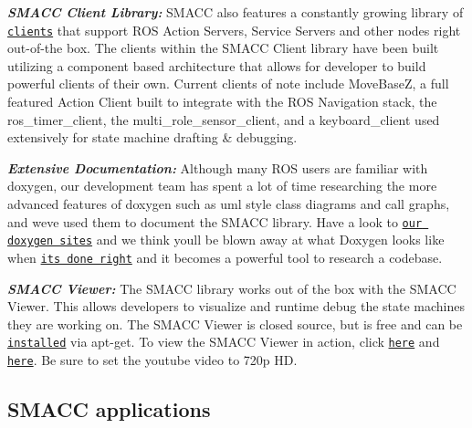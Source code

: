\begin{DoxyItemize}
\item {\itshape {\bfseries S\+M\+A\+CC Client Library\+:}} S\+M\+A\+CC also features a constantly growing library of \href{https://github.com/reelrbtx/SMACC/tree/master/smacc_client_library}{\tt clients} that support R\+OS Action Servers, Service Servers and other nodes right out-\/of-\/the box. The clients within the S\+M\+A\+CC Client library have been built utilizing a component based architecture that allows for developer to build powerful clients of their own. Current clients of note include Move\+BaseZ, a full featured Action Client built to integrate with the R\+OS Navigation stack, the ros\+\_\+timer\+\_\+client, the multi\+\_\+role\+\_\+sensor\+\_\+client, and a keyboard\+\_\+client used extensively for state machine drafting \& debugging.
\begin{DoxyItemize}
\item {\itshape {\bfseries Extensive Documentation\+:}} Although many R\+OS users are familiar with doxygen, our development team has spent a lot of time researching the more advanced features of doxygen such as uml style class diagrams and call graphs, and we\textquotesingle{}ve used them to document the S\+M\+A\+CC library. Have a look to \href{https://reelrbtx.github.io/SMACC_Documentation/master/html/namespaces.html}{\tt our doxygen sites} and we think you\textquotesingle{}ll be blown away at what Doxygen looks like when \href{https://reelrbtx.github.io/SMACC_Documentation/master/html/classsmacc_1_1ISmaccStateMachine.html}{\tt it\textquotesingle{}s done right} and it becomes a powerful tool to research a codebase.
\item {\itshape {\bfseries S\+M\+A\+CC Viewer\+:}} The S\+M\+A\+CC library works out of the box with the S\+M\+A\+CC Viewer. This allows developers to visualize and runtime debug the state machines they are working on. The S\+M\+A\+CC Viewer is closed source, but is free and can be \href{http://smacc.dev/smacc-viewer/}{\tt installed} via apt-\/get. To view the S\+M\+A\+CC Viewer in action, click \href{https://www.youtube.com/watch?v=WVt4M_teA5I}{\tt here} and \href{https://www.youtube.com/watch?v=fdy37WvC4FQ}{\tt here}. Be sure to set the youtube video to 720p HD.
\end{DoxyItemize}
\end{DoxyItemize}

\subsection*{S\+M\+A\+CC applications}

